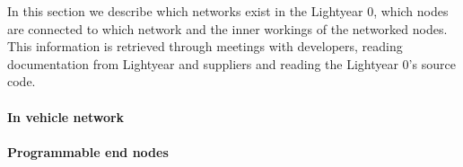 In this section we describe which networks exist in the Lightyear 0, which nodes are connected to which network and the inner workings of the networked nodes. This information is retrieved through meetings with developers, reading documentation from Lightyear and suppliers and reading the Lightyear 0's source code.
\paragraph{In vehicle network}


\paragraph{Programmable end nodes}
